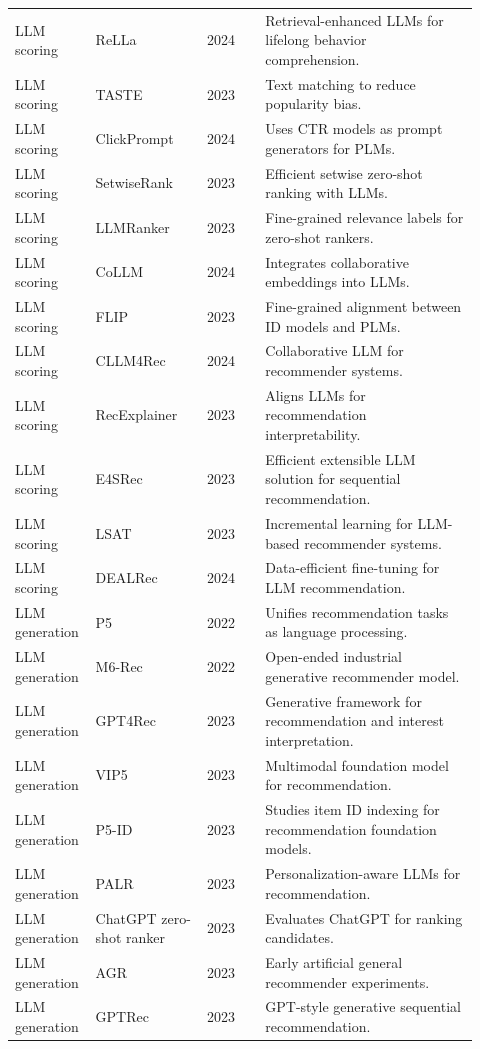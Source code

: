 \documentclass[11pt]{article}
\begin{document}
\begin{longtable}{@{}p{0.13\linewidth}p{0.23\linewidth}p{0.12\linewidth}p{0.44\linewidth}@{}}
LLM scoring & ReLLa & 2024 & Retrieval-enhanced LLMs for lifelong behavior comprehension.\\
LLM scoring & TASTE & 2023 & Text matching to reduce popularity bias.\\
LLM scoring & ClickPrompt & 2024 & Uses CTR models as prompt generators for PLMs.\\
LLM scoring & SetwiseRank & 2023 & Efficient setwise zero-shot ranking with LLMs.\\
LLM scoring & LLMRanker & 2023 & Fine-grained relevance labels for zero-shot rankers.\\
LLM scoring & CoLLM & 2024 & Integrates collaborative embeddings into LLMs.\\
LLM scoring & FLIP & 2023 & Fine-grained alignment between ID models and PLMs.\\
LLM scoring & CLLM4Rec & 2024 & Collaborative LLM for recommender systems.\\
LLM scoring & RecExplainer & 2023 & Aligns LLMs for recommendation interpretability.\\
LLM scoring & E4SRec & 2023 & Efficient extensible LLM solution for sequential recommendation.\\
LLM scoring & LSAT & 2023 & Incremental learning for LLM-based recommender systems.\\
LLM scoring & DEALRec & 2024 & Data-efficient fine-tuning for LLM recommendation.\\
LLM generation & P5 & 2022 & Unifies recommendation tasks as language processing.\\
LLM generation & M6-Rec & 2022 & Open-ended industrial generative recommender model.\\
LLM generation & GPT4Rec & 2023 & Generative framework for recommendation and interest interpretation.\\
LLM generation & VIP5 & 2023 & Multimodal foundation model for recommendation.\\
LLM generation & P5-ID & 2023 & Studies item ID indexing for recommendation foundation models.\\
LLM generation & PALR & 2023 & Personalization-aware LLMs for recommendation.\\
LLM generation & ChatGPT zero-shot ranker & 2023 & Evaluates ChatGPT for ranking candidates.\\
LLM generation & AGR & 2023 & Early artificial general recommender experiments.\\
LLM generation & GPTRec & 2023 & GPT-style generative sequential recommendation.\\

\end{longtable}
\end{document}
